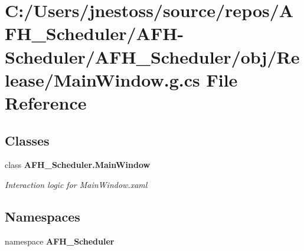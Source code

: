 \section{C\+:/\+Users/jnestoss/source/repos/\+A\+F\+H\+\_\+\+Scheduler/\+A\+F\+H-\/\+Scheduler/\+A\+F\+H\+\_\+\+Scheduler/obj/\+Release/\+Main\+Window.g.\+cs File Reference}
\label{_release_2_main_window_8g_8cs}
\subsection*{Classes}
\begin{DoxyCompactItemize}
\item 
class \textbf{ A\+F\+H\+\_\+\+Scheduler.\+Main\+Window}
\begin{DoxyCompactList}\small\item\em Interaction logic for Main\+Window.\+xaml \end{DoxyCompactList}\end{DoxyCompactItemize}
\subsection*{Namespaces}
\begin{DoxyCompactItemize}
\item 
namespace \textbf{ A\+F\+H\+\_\+\+Scheduler}
\end{DoxyCompactItemize}
